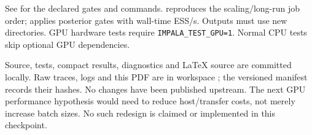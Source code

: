 \documentclass[11pt]{article}
\begin{document}
See  for the declared gates and commands.
 reproduces the scaling/long-run job order;
 applies posterior gates with wall-time
ESS/s. Outputs must use new directories. GPU hardware tests require
\texttt{IMPALA\_TEST\_GPU=1}. Normal CPU tests skip optional GPU dependencies.

Source, tests, compact results, diagnostics and LaTeX source are committed
locally. Raw traces, logs and this PDF are in workspace
; the versioned manifest records their hashes.
No changes have been published upstream. The next GPU performance hypothesis
would need to reduce host/transfer costs, not merely increase batch sizes.
No such redesign is claimed or implemented in this checkpoint.
\end{document}
